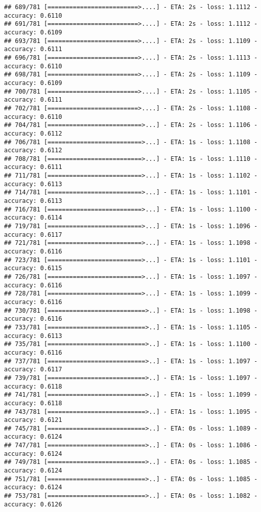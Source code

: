 \documentclass[
]{article}
\begin{document}
\begin{verbatim}
## 689/781 [=========================>....] - ETA: 2s - loss: 1.1112 - accuracy: 0.6110
## 691/781 [=========================>....] - ETA: 2s - loss: 1.1112 - accuracy: 0.6109
## 693/781 [=========================>....] - ETA: 2s - loss: 1.1109 - accuracy: 0.6111
## 696/781 [=========================>....] - ETA: 2s - loss: 1.1113 - accuracy: 0.6110
## 698/781 [=========================>....] - ETA: 2s - loss: 1.1109 - accuracy: 0.6109
## 700/781 [=========================>....] - ETA: 2s - loss: 1.1105 - accuracy: 0.6111
## 702/781 [=========================>....] - ETA: 2s - loss: 1.1108 - accuracy: 0.6110
## 704/781 [==========================>...] - ETA: 2s - loss: 1.1106 - accuracy: 0.6112
## 706/781 [==========================>...] - ETA: 1s - loss: 1.1108 - accuracy: 0.6112
## 708/781 [==========================>...] - ETA: 1s - loss: 1.1110 - accuracy: 0.6111
## 711/781 [==========================>...] - ETA: 1s - loss: 1.1102 - accuracy: 0.6113
## 714/781 [==========================>...] - ETA: 1s - loss: 1.1101 - accuracy: 0.6113
## 716/781 [==========================>...] - ETA: 1s - loss: 1.1100 - accuracy: 0.6114
## 719/781 [==========================>...] - ETA: 1s - loss: 1.1096 - accuracy: 0.6117
## 721/781 [==========================>...] - ETA: 1s - loss: 1.1098 - accuracy: 0.6116
## 723/781 [==========================>...] - ETA: 1s - loss: 1.1101 - accuracy: 0.6115
## 726/781 [==========================>...] - ETA: 1s - loss: 1.1097 - accuracy: 0.6116
## 728/781 [==========================>...] - ETA: 1s - loss: 1.1099 - accuracy: 0.6116
## 730/781 [===========================>..] - ETA: 1s - loss: 1.1098 - accuracy: 0.6116
## 733/781 [===========================>..] - ETA: 1s - loss: 1.1105 - accuracy: 0.6113
## 735/781 [===========================>..] - ETA: 1s - loss: 1.1100 - accuracy: 0.6116
## 737/781 [===========================>..] - ETA: 1s - loss: 1.1097 - accuracy: 0.6117
## 739/781 [===========================>..] - ETA: 1s - loss: 1.1097 - accuracy: 0.6118
## 741/781 [===========================>..] - ETA: 1s - loss: 1.1099 - accuracy: 0.6118
## 743/781 [===========================>..] - ETA: 1s - loss: 1.1095 - accuracy: 0.6121
## 745/781 [===========================>..] - ETA: 0s - loss: 1.1089 - accuracy: 0.6124
## 747/781 [===========================>..] - ETA: 0s - loss: 1.1086 - accuracy: 0.6124
## 749/781 [===========================>..] - ETA: 0s - loss: 1.1085 - accuracy: 0.6124
## 751/781 [===========================>..] - ETA: 0s - loss: 1.1085 - accuracy: 0.6124
## 753/781 [===========================>..] - ETA: 0s - loss: 1.1082 - accuracy: 0.6126

\end{verbatim}
\end{document}

